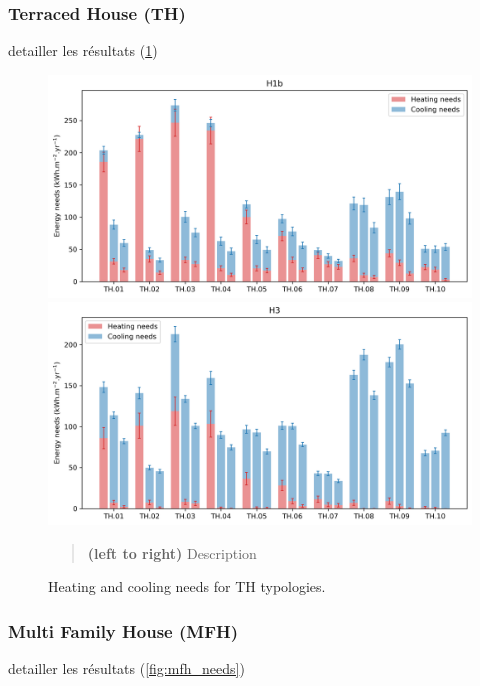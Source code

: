 \documentclass[11pt]{article}
\begin{document}

        \subsubsection{Terraced House (TH)} %
        \label{ssub:th}

        detailler les résultats (\ref{fig:th_needs})

        \begin{figure}[ht]
            \centering
            \includegraphics[width=0.49\columnwidth]{figures/typology_energy_needs_TH_H1b_2000-2020.png}
            \includegraphics[width=0.49\columnwidth]{figures/typology_energy_needs_TH_H3_2000-2020.png}
            \caption{\label{fig:th_needs} Heating and cooling needs for TH typologies.}
            \begin{quote}
                \vspace{-2mm}
                \small\noindent
                \textbf{(left to right)} Description
            \end{quote}
        \end{figure}
        

        \subsubsection{Multi Family House (MFH)} %
        \label{ssub:mfh}
        
        detailler les résultats (\ref{fig:mfh_needs})
\end{document}
